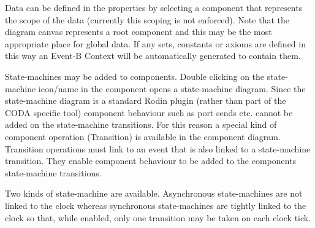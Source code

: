 Data can be defined in the properties by selecting a component that represents the scope of the data (currently this scoping is not enforced). Note that the diagram canvas represents a root component and this may be the most appropriate place for global data. If any sets, constants or axioms are defined in this way an Event-B Context will be automatically generated to contain them.



State-machines may be added to components. Double clicking on the state-machine icon/name in the component opens a state-machine diagram. Since the state-machine diagram is a standard Rodin plugin (rather than part of the CODA specific tool) component behaviour such as port sends etc. cannot be added on the state-machine transitions. For this reason a special kind of component operation (Transition) is available in the component diagram. Transition operations must link to an event that is also linked to a state-machine transition. They enable component behaviour to be added to the components state-machine transitions. 


Two kinds of state-machine are available. Asynchronous state-machines are not linked to the clock whereas synchronous state-machines are tightly linked to the clock so that, while enabled, only one transition may be taken on each clock tick.




